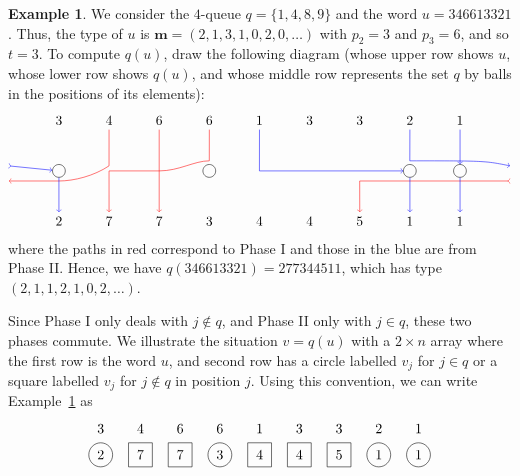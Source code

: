\documentclass[reqno]{amsart}
\newcommand{\0}{\phantom{c}}
\newcommand{\mm}{\mathbf{m}}
\theoremstyle{plain}
\theoremstyle{definition}
\newtheorem{example}[thm]{Example}
\numberwithin{equation}{section}
\begin{document}
\begin{example}
\label{ex:first_queue}
We consider the $4$-queue $q = \{1, 4, 8, 9\}$ and the word $u = 346613321$.
Thus, the type of $u$ is $\mm = (2, 1, 3, 1, 0, 2, 0, \ldots)$ with $p_2 = 3$ and $p_3 = 6$, and so $t = 3$.
To compute $q(u)$, draw the following diagram
(whose upper row shows $u$, whose lower row shows $q(u)$,
and whose middle row represents the set $q$ by balls in the positions of its elements):
\[
\begin{tikzpicture}[scale=1.3,baseline=0]
\node (i1) at (1,1) {$3$};
\node (i2) at (2,1) {$4$};
\node (i3) at (3,1) {$6$};
\node (i4) at (4,1) {$6$};
\node (i5) at (5,1) {$1$};
\node (i6) at (6,1) {$3$};
\node (i7) at (7,1) {$3$};
\node (i8) at (8,1) {$2$};
\node (i9) at (9,1) {$1$};
\node (t1) at (1,-1) {$2$};
\node (t2) at (2,-1) {$7$};
\node (t3) at (3,-1) {$7$};
\node (t4) at (4,-1) {$3$};
\node (t5) at (5,-1) {$4$};
\node (t6) at (6,-1) {$4$};
\node (t7) at (7,-1) {$5$};
\node (t8) at (8,-1) {$1$};
\node (t9) at (9,-1) {$1$};
\node[circle,draw=black] (q1) at (1,0) {};
\node[circle,draw=black] (q2) at (4,0) {};
\node[circle,draw=black] (q3) at (8,0) {};
\node[circle,draw=black] (q4) at (9,0) {};
\draw[->,red] (i4) -- (4,0.2) .. controls (3.7,0.2) and (3.4,0) .. (3,0) -- (2,0) -- (t2);
\draw[->,red] (i3) -- (t3);
\draw[->,red] (i2) -- (2,0.1) .. controls (1.7,-0.1) and (1.3,-0.2) .. (1,-0.2) -- (0,-0.2);
\draw[>->,red] (10,-0.2) -- (8,-0.2) -- (7,-0.2) -- (t7);
\draw[->,blue] (i5) -- (5,0) -- (q3);
\draw[->,blue] (q3) -- (t8);
\draw[->,blue] (i9) -- (q4);
\draw[->,blue] (q4) -- (t9);
\draw[->,blue] (i8) -- (8,0.2) .. controls (9.5,0.2) .. (10,0.1);
\draw[>->,blue] (0,0.1) -- (q1);
\draw[->,blue] (q1) -- (t1);
\end{tikzpicture}
\]
where the paths in red correspond to Phase I and those in the blue are from Phase II. Hence, we have $q(346613321) = 277344511$, which has type $(2,1,1,2,1,0,2,\ldots)$.
\end{example}

Since Phase I only deals with $j \notin q$, and Phase II only with $j\in q$, these two phases commute.
We illustrate the situation $v = q(u)$ with a $2 \times n$ array where the first row is the word $u$, and second row has a circle labelled $v_j$ for $j \in q$ or a square labelled $v_j$ for $j \notin q$ in position $j$.
Using this convention, we can write Example~\ref{ex:first_queue} as
\[
\begin{tikzpicture}[baseline=10]
  \def\ll{0.65}   %
  \foreach \i in {5,9} { \node at (\i,\ll) {$1$}; }
  \foreach \i in {8} { \node at (\i,\ll) {$2$}; }
  \foreach \i in {1,6,7} { \node at (\i,\ll) {$3$}; }
  \foreach \i in {2} { \node at (\i,\ll) {$4$}; }
  \foreach \i in {3,4} { \node at (\i,\ll) {$6$}; }
  \foreach \i in {1,4,8,9} { \draw (\i,0) circle (0.3); }
  \foreach \i in {2,3,5,6,7} { \draw (\i-.3,0-.3) rectangle +(0.6,+0.6); }
  \foreach \i in {8,9} { \node at (\i,0) {$1$}; }
  \foreach \i in {1} { \node at (\i,0) {$2$}; }
  \foreach \i in {4} { \node at (\i,0) {$3$}; }
  \foreach \i in {5,6} { \node at (\i,0) {$4$}; }
  \foreach \i in {7} { \node at (\i,0) {$5$}; }
  \foreach \i in {2,3} { \node at (\i,0) {$7$}; }
\end{tikzpicture}
\]
\end{document}
